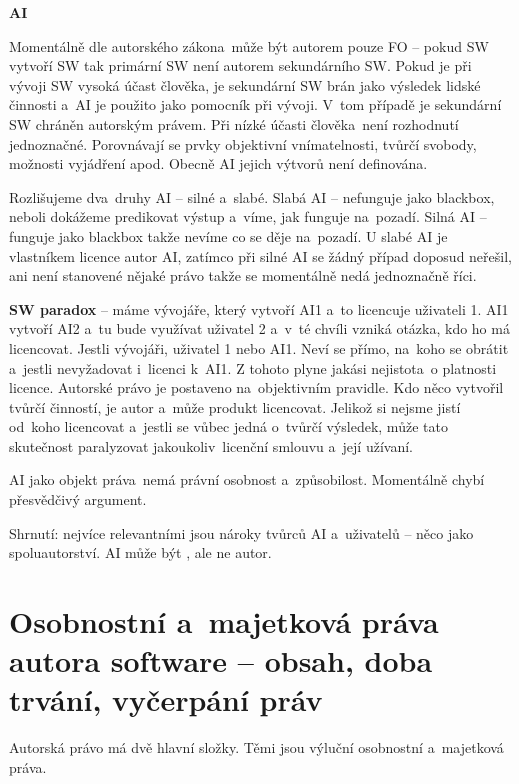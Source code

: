 \vspace{1cm}
\noindent\textbf{AI}

\noindent Momentálně dle autorského zákona~může být autorem pouze FO -- pokud SW vytvoří SW tak primární SW není autorem sekundárního SW. Pokud je při vývoji SW vysoká účast člověka, je sekundární SW brán jako výsledek lidské činnosti a~AI je použito jako pomocník při vývoji. V~tom případě je sekundární SW chráněn autorským právem. Při nízké účasti člověka~není rozhodnutí jednoznačné. Porovnávají se prvky objektivní vnímatelnosti, tvůrčí svobody, možnosti vyjádření apod. Obecně AI jejich výtvorů není definována.

Rozlišujeme dva~druhy AI -- silné a~slabé. Slabá AI -- nefunguje jako blackbox, neboli dokážeme predikovat výstup a~víme, jak funguje na~pozadí. Silná AI -- funguje jako blackbox takže nevíme co se děje na~pozadí. U slabé AI je vlastníkem licence autor AI, zatímco při silné AI se žádný případ doposud neřešil, ani není stanovené nějaké právo takže se momentálně nedá jednoznačně říci.

\textbf{SW paradox} -- máme vývojáře, který vytvoří AI1 a~to licencuje uživateli 1. AI1 vytvoří AI2 a~tu bude využívat uživatel 2 a~v~té chvíli vzniká otázka, kdo ho má licencovat. Jestli vývojáři, uživatel 1 nebo AI1. Neví se přímo, na~koho se obrátit a~jestli nevyžadovat i~licenci k~AI1. Z tohoto plyne jakási nejistota~o platnosti licence. Autorské právo je postaveno na~objektivním pravidle. Kdo něco vytvořil tvůrčí činností, je autor a~může produkt licencovat. Jelikož si nejsme jistí od~koho licencovat a~jestli se vůbec jedná o~tvůrčí výsledek, může tato skutečnost paralyzovat jakoukoliv~licenční smlouvu a~její užívaní.

AI jako objekt práva~nemá právní osobnost a~způsobilost. Momentálně chybí přesvědčivý argument.

Shrnutí: nejvíce relevantními jsou nároky tvůrců AI a~uživatelů -- něco jako spoluautorství. AI může být , ale ne autor.










\clearpage
\section{Osobnostní a~majetková práva autora software -- obsah, doba trvání, vyčerpání práv}

Autorská právo má dvě hlavní složky. Těmi jsou výluční osobnostní a~majetková práva.

